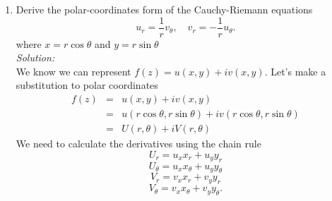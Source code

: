 \documentclass[10pt]{amsart}
\theoremstyle{nonumberplain}
\begin{document}
\begin{enumerate}[label={\bf {\arabic*}:}]
\item Derive the polar-coordinates form of the Cauchy-Riemann equations
$$
u_r=\frac{1}{r} v_\theta, \quad v_r=-\frac{1}{r} u_\theta.
$$
where $x=r \cos \theta$ and $y=r \sin \theta$ \\
\textit{Solution:} \\
We know we can represent $f(z) = u(x, y) + i v(x, y)$.
Let's make a substitution to polar coordinates
\begin{eqnarray*}
f(z) &=& u(x, y) + i v(x, y) \\
      &=& u(r \cos \theta, r \sin \theta) + i v(r \cos \theta, r \sin \theta) \\
      &=& U(r, \theta) + iV(r, \theta)
\end{eqnarray*}
We need to calculate the derivatives using the chain rule
$$U_r = u_xx_r + u_yy_r$$
$$U_\theta = u_xx_\theta + u_yy_\theta$$
$$V_r = v_xx_r + v_yy_r$$
$$V_\theta = v_xx_\theta + v_yy_\theta.$$


\end{enumerate}
\end{document}
